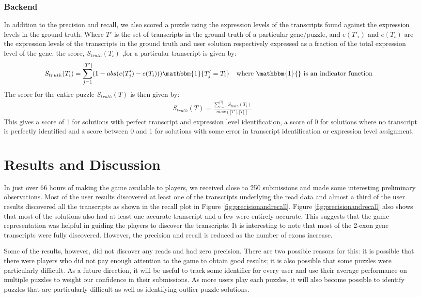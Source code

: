 \documentclass[12pt]{article}
\begin{document}
\subsubsection*{Backend}
In addition to the precision and recall, we also scored a puzzle using the expression levels of the transcripts found against the expression levels in the ground truth. Where $T'$ is the set of transcripts in the ground truth of a particular gene/puzzle, and $e(T'_i)$ and $e(T_i)$ are the expression levels of the transcripts in the ground truth and user solution respectively expressed as a fraction of the total expression level of the gene, the score, $S_{truth}(T_i)$ ,for a particular transcript is given by:
\begin{align*}
S_{truth}(T_i) &= \sum\limits_{j = 1}^{|T'|}(1 - abs(e(T'_j) - e(T_i)))\mathbbm{1}\{T'_j = T_i\} \quad \text{where $\mathbbm{1}\{\}$ is an indicator function}
\end{align*}
The score for the entire puzzle $S_{truth}(T)$ is then given by:
\begin{align*}
S_{truth}(T) = \frac{\sum\limits_{i=1}^{|T|} S_{truth}(T_i)}{max(|T'|, |T|)}
\end{align*}
This gives a score of 1 for solutions with perfect transcript and expression level identification, a score of 0 for solutions where no transcript is perfectly identified and a score between 0 and 1 for solutions with some error in transcript identification or expression level assignment.

\section*{Results and Discussion}
In just over 66 hours of making the game available to players, we received close to 250 submissions and made some interesting preliminary observations. Most of the user results discovered at least one of the transcripts underlying the read data and almost a third of the user results discovered all the transcripts as shown in the recall plot in Figure \ref{fig:precisionandrecall}. Figure \ref{fig:precisionandrecall} also shows that most of the solutions also had at least one accurate transcript and a few were entirely accurate. This suggests that the game representation was helpful in guiding the players to discover the transcripts. It is interesting to note that most of the 2-exon gene transcripts were fully discovered. However, the precision and recall is reduced as the number of exons increase.

Some of the results, however, did not discover any reads and had zero precision. There are two possible reasons for this: it is possible that there were players who did not pay enough attention to the game to obtain good results; it is also possible that some puzzles were particularly difficult. As a future direction, it will be useful to track some identifier for every user and use their average performance on multiple puzzles to weight our confidence in their submissions. As more users play each puzzles, it will also become possible to identify puzzles that are particularly difficult as well as identifying outlier puzzle solutions.
\end{document}
